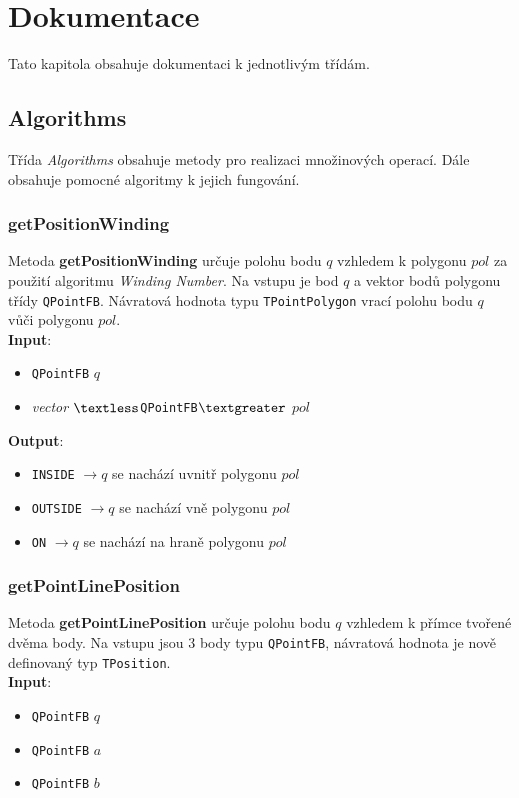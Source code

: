 \documentclass[a4paper, 12pt]{article}
\begin{document}
 
\section{Dokumentace}
Tato kapitola obsahuje dokumentaci k jednotlivým třídám.

\subsection{Algorithms}
Třída \textit{Algorithms} obsahuje metody pro realizaci množinových operací. Dále obsahuje pomocné algoritmy k jejich fungování.

\subsubsection*{getPositionWinding}
Metoda \textbf{getPositionWinding} určuje polohu bodu $q$ vzhledem k polygonu $pol$ za použití algoritmu \textsl{Winding Number}. Na vstupu je bod $q$ a vektor bodů polygonu třídy \texttt{QPointFB}. Návratová hodnota typu \texttt{TPointPolygon} vrací polohu bodu $q$ vůči polygonu $pol$.\\

\textbf{Input}:
\begin{itemize}
\item \texttt{QPointFB} $q$
\item \textsl{vector} $\textless$\texttt{QPointFB}$\textgreater$ $pol$
\end{itemize}

\textbf{Output}:
\begin{itemize}
\item \texttt{INSIDE} $\rightarrow q$ se nachází uvnitř polygonu $pol$
\item \texttt{OUTSIDE} $\rightarrow q$ se nachází vně polygonu $pol$
\item \texttt{ON} $\rightarrow q$ se nachází na hraně polygonu $pol$
\end{itemize}

\subsubsection*{getPointLinePosition}
Metoda \textbf{getPointLinePosition} určuje polohu bodu $q$ vzhledem k přímce tvořené dvěma body. Na vstupu jsou 3 body typu \texttt{QPointFB}, návratová hodnota je nově definovaný typ \texttt{TPosition}.\\

\textbf{Input}:
\begin{itemize}
\item \texttt{QPointFB} $q$
\item \texttt{QPointFB} $a$
\item \texttt{QPointFB} $b$
\end{itemize}
\end{document}
